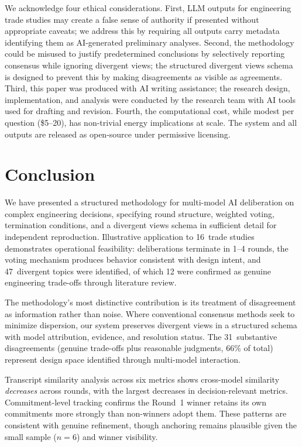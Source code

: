 \documentclass[11pt,a4paper]{article}
\begin{document}
We acknowledge four ethical considerations. First, LLM outputs for engineering trade studies may create a false sense of authority if presented without appropriate caveats; we address this by requiring all outputs carry metadata identifying them as AI-generated preliminary analyses. Second, the methodology could be misused to justify predetermined conclusions by selectively reporting consensus while ignoring divergent views; the structured divergent views schema is designed to prevent this by making disagreements as visible as agreements. Third, this paper was produced with AI writing assistance; the research design, implementation, and analysis were conducted by the research team with AI tools used for drafting and revision. Fourth, the computational cost, while modest per question (\$5--20), has non-trivial energy implications at scale. The system and all outputs are released as open-source under permissive licensing.

\section{Conclusion}
\label{sec:conclusion}

We have presented a structured methodology for multi-model AI deliberation on complex engineering decisions, specifying round structure, weighted voting, termination conditions, and a divergent views schema in sufficient detail for independent reproduction. Illustrative application to 16~trade studies demonstrates operational feasibility: deliberations terminate in 1--4 rounds, the voting mechanism produces behavior consistent with design intent, and 47~divergent topics were identified, of which 12 were confirmed as genuine engineering trade-offs through literature review.

The methodology's most distinctive contribution is its treatment of disagreement as information rather than noise. Where conventional consensus methods seek to minimize dispersion, our system preserves divergent views in a structured schema with model attribution, evidence, and resolution status. The 31~substantive disagreements (genuine trade-offs plus reasonable judgments, 66\% of total) represent design space identified through multi-model interaction.

Transcript similarity analysis across six metrics shows cross-model similarity \emph{decreases} across rounds, with the largest decreases in decision-relevant metrics. Commitment-level tracking confirms the Round~1 winner retains its own commitments more strongly than non-winners adopt them. These patterns are consistent with genuine refinement, though anchoring remains plausible given the small sample ($n = 6$) and winner visibility.
\end{document}
